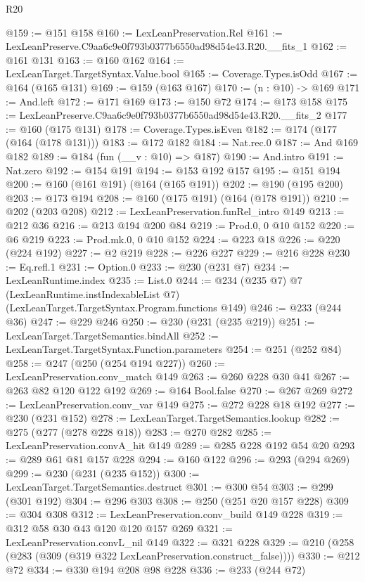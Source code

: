 \begin{lexlean}{R20}
\begin{coremodule}
@159 := @151 @158
@160 := LexLeanPreservation.Rel
@161 := LexLeanPreserve.C9aa6c9e0f793b0377b6550ad98d54e43.R20.__fits_1
@162 := @161 @131
@163 := @160 @162
@164 := LexLeanTarget.TargetSyntax.Value.bool
@165 := Coverage.Types.isOdd
@167 := @164 (@165 @131)
@169 := @159 (@163 @167)
@170 := (n : @10) -> @169
@171 := And.left
@172 := @171 @169
@173 := @150 @72
@174 := @173 @158
@175 := LexLeanPreserve.C9aa6c9e0f793b0377b6550ad98d54e43.R20.__fits_2
@177 := @160 (@175 @131)
@178 := Coverage.Types.isEven
@182 := @174 (@177 (@164 (@178 @131)))
@183 := @172 @182
@184 := Nat.rec.{0}
@187 := And @169 @182
@189 := @184 (fun (__v : @10) => @187)
@190 := And.intro
@191 := Nat.zero
@192 := @154 @191
@194 := @153 @192 @157
@195 := @151 @194
@200 := @160 (@161 @191) (@164 (@165 @191))
@202 := @190 (@195 @200)
@203 := @173 @194
@208 := @160 (@175 @191) (@164 (@178 @191))
@210 := @202 (@203 @208)
@212 := LexLeanPreservation.funRel_intro @149
@213 := @212 @36
@216 := @213 @194 @200 @84
@219 := Prod.{0, 0} @10 @152
@220 := @6 @219
@223 := Prod.mk.{0, 0} @10 @152
@224 := @223 @18
@226 := @220 (@224 @192)
@227 := @2 @219
@228 := @226 @227
@229 := @216 @228
@230 := Eq.refl.{1}
@231 := Option.{0}
@233 := @230 (@231 @7)
@234 := LexLeanRuntime.index
@235 := List.{0}
@244 := @234
    (@235 @7)
    @7
    (LexLeanRuntime.instIndexableList @7)
    (LexLeanTarget.TargetSyntax.Program.functions @149)
@246 := @233 (@244 @36)
@247 := @229 @246
@250 := @230 (@231 (@235 @219))
@251 := LexLeanTarget.TargetSemantics.bindAll
@252 := LexLeanTarget.TargetSyntax.Function.parameters
@254 := @251 (@252 @84)
@258 := @247 (@250 (@254 @194 @227))
@260 := LexLeanPreservation.conv_match @149
@263 := @260 @228 @30 @41
@267 := @263 @82 @120 @122 @192
@269 := @164 Bool.false
@270 := @267 @269
@272 := LexLeanPreservation.conv_var @149
@275 := @272 @228 @18 @192
@277 := @230 (@231 @152)
@278 := LexLeanTarget.TargetSemantics.lookup
@282 := @275 (@277 (@278 @228 @18))
@283 := @270 @282
@285 := LexLeanPreservation.convA_hit @149
@289 := @285 @228 @192 @54 @20
@293 := @289 @61 @81 @157 @228
@294 := @160 @122
@296 := @293 (@294 @269)
@299 := @230 (@231 (@235 @152))
@300 := LexLeanTarget.TargetSemantics.destruct
@301 := @300 @54
@303 := @299 (@301 @192)
@304 := @296 @303
@308 := @250 (@251 @20 @157 @228)
@309 := @304 @308
@312 := LexLeanPreservation.conv_build @149 @228
@319 := @312 @58 @30 @43 @120 @120 @157 @269
@321 := LexLeanPreservation.convL_nil @149
@322 := @321 @228
@329 := @210 (@258 (@283 (@309 (@319 @322 LexLeanPreservation.construct_false))))
@330 := @212 @72
@334 := @330 @194 @208 @98 @228
@336 := @233 (@244 @72)

\end{coremodule}
\end{lexlean}
